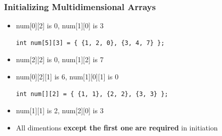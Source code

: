 \documentclass{../c-lecture}
\begin{document}
\begin{frame}[fragile]
  \frametitle{Initializing Multidimensional Arrays}
  \begin{itemize}
    \begin{verbatim}
int num[2][3] = {1, 2, 0, 3, 4, 7};
int num[2][3] = { {1, 2, 0}, {3, 4, 7} };
    \end{verbatim}
    \item num[0][2] is 0, num[1][0] is 3
    \begin{verbatim}
int num[5][3] = { {1, 2, 0}, {3, 4, 7} };
    \end{verbatim}
    \item num[2][2] is 0, num[1][2] is 7
  \end{itemize}
\end{frame}

\begin{frame}[fragile]
  \begin{itemize}
    \begin{verbatim}
int num[2][3][2] = { { {1, 2}, {3, 4}, {5, 6} }, { {1}, {2}, {3} } };
    \end{verbatim}
    \item num[0][2][1] is 6, num[1][0][1] is 0
    \begin{verbatim}
int num[][2] = { {1, 1}, {2, 2}, {3, 3} };
    \end{verbatim}
    \item num[1][1] is 2, num[2][0] is 3
    \item
      All dimentions
      \textbf{\color{Orange} except the first one} \textbf{\color{Yellow} are required} in
      initiation
  \end{itemize}
\end{frame}
\end{document}
